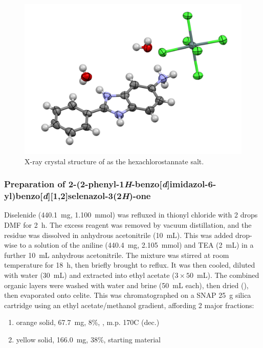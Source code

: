 \begin{refsection}
\begin{figure}[ht]
    \centering
    \includegraphics[width=0.8\linewidth]{Figures/rhs-amine-xray.pdf}
    \caption{X-ray crystal structure of  as the hexachlorostannate salt.}\label{fig:rhs-amine-xray}
\end{figure}

\subsubsection[Preparation of \refcmpd{ebs-rhs-ph}]{Preparation of 2-(2-phenyl-1\emph{H}-benzo[\emph{d}]imidazol-6-yl)benzo[\emph{d}][1,2]\-selenazol-3(2\emph{H})-one }
Diselenide  (440.1~mg, 1.100~mmol) was refluxed in thionyl chloride with 2 drops DMF for 2~h.
The excess reagent was removed by vacuum distillation, and the residue was dissolved in anhydrous acetonitrile (10~mL).
This was added drop-wise to a solution of the aniline  (440.4~mg, 2.105~mmol) and TEA (2~mL) in a further 10~mL anhydrous acetonitrile.
The mixture was stirred at room temperature for 18~h, then briefly brought to reflux.
It was then cooled, diluted with water (30~mL) and extracted into ethyl acetate ($3\times50$~mL).
The combined organic layers were washed with water and brine (50~mL each), then dried (), then evaporated onto celite.
This was chromatographed on a SNAP 25~g silica cartridge using an ethyl acetate/methanol gradient, affording 2 major fractions:
\begin{enumerate}
    \item orange solid, 67.7~mg, 8\%, , m.p. 170\degree{}C (dec.)
    \item yellow solid, 166.0~mg, 38\%, starting material 
\end{enumerate}


\end{refsection}
